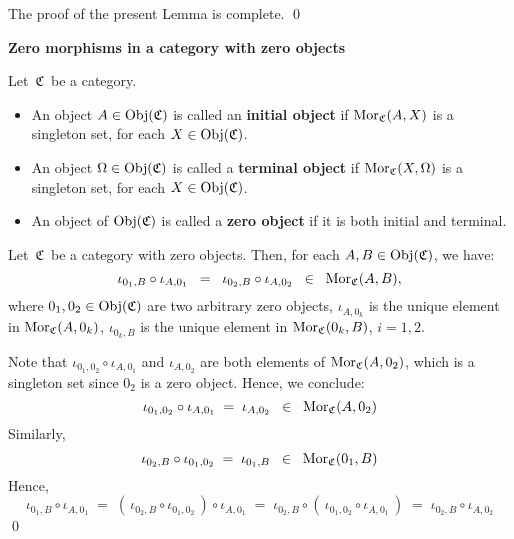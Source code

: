 \vskip 0.3cm
\noindent
The proof of the present Lemma is complete.
\qed


\vskip 1.0cm
\noindent
\textbf{\large Zero morphisms in a category with zero objects}


\vskip 0.5cm
\begin{definition}
\mbox{}
\vskip 0.15cm
\noindent
Let \,$\mathfrak{C}$\, be a category.
\begin{itemize}
\item
	An object $A \in \textnormal{Obj}(\mathfrak{C})$ is called an \textbf{initial object} if $\textnormal{Mor}_{\mathfrak{C}}(A,X)$ is a singleton set,
	for each $X \in \textnormal{Obj}(\mathfrak{C})$.
\item
	An object $\Omega \in \textnormal{Obj}(\mathfrak{C})$ is called a \textbf{terminal object} if $\textnormal{Mor}_{\mathfrak{C}}(X,\Omega)$ is a singleton set,
	for each $X \in \textnormal{Obj}(\mathfrak{C})$.
\item
	An object of $\textnormal{Obj}(\mathfrak{C})$ is called a \textbf{zero object} if it is both initial and terminal.
\end{itemize}
\end{definition}


\vskip 0.5cm
\begin{lemma}\label{ZeroMorphisms}
\mbox{}
\vskip 0.15cm
\noindent
Let \,$\mathfrak{C}$\, be a category with zero objects.
Then, for each $A, B \in \textnormal{Obj}(\mathfrak{C})$, we have:
\begin{equation*}
\iota_{0_{1},B}\circ\iota_{A,0_{1}}
\;\; = \;\;
	\iota_{0_{2},B}\circ\iota_{A,0_{2}}
\;\; \in \;\;
	\textnormal{Mor}_{\mathfrak{C}}(A,B),
\end{equation*}
where
$0_{1}, 0_{2} \in \textnormal{Obj}(\mathfrak{C})$ are two arbitrary zero objects,
$\iota_{A,0_{k}}$ is the unique element in $\textnormal{Mor}_{\mathfrak{C}}(A,0_{k})$,
$\iota_{0_{k},B}$ is the unique element in $\textnormal{Mor}_{\mathfrak{C}}(0_{k},B)$,
$i = 1,2$.
\end{lemma}
\proof
Note that $\iota_{0_{1},0_{2}}\circ\iota_{A,0_{1}}$ and $\iota_{A,0_{2}}$ are both elements of $\textnormal{Mor}_{\mathfrak{C}}(A,0_{2})$,
which is a singleton set since $0_{2}$ is a zero object. Hence, we conclude:
\begin{equation*}
\iota_{0_{1},0_{2}}\circ\iota_{A,0_{1}} \; = \; \iota_{A,0_{2}} \;\; \in \;\; \textnormal{Mor}_{\mathfrak{C}}(A,0_{2})
\end{equation*}
Similarly,
\begin{equation*}
\iota_{0_{2},B}\circ\iota_{0_{1},0_{2}} \; = \; \iota_{0_{1},B} \;\; \in \;\; \textnormal{Mor}_{\mathfrak{C}}(0_{1},B)
\end{equation*}
Hence,
\begin{equation*}
\iota_{0_{1},B} \circ \iota_{A,0_{1}}
\; = \;
	(\,\iota_{0_{2},B}\circ\iota_{0_{1},0_{2}}\,) \circ \iota_{A,0_{1}}
\; = \;
	\iota_{0_{2},B} \circ (\,\iota_{0_{1},0_{2}} \circ \iota_{A,0_{1}}\,)
\; = \;
	\iota_{0_{2},B} \circ \iota_{A,0_{2}}
\end{equation*}
\qed

